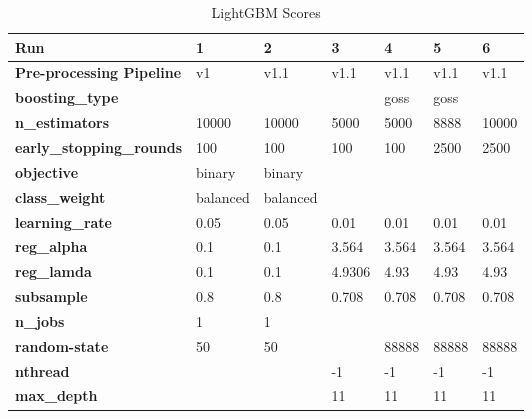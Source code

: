 \documentclass[sigconf, nonacm]{acmart}
\begin{document}
\begin{table}[t]
	\centering
	\caption{LightGBM Scores}
	\label{tab:lgb}
	\begin{tabular}{@{}|l|l|l|l|l|l|l|@{}}
		\toprule
		\textbf{Run}                     & \textbf{1} & \textbf{2} & \textbf{3} & \textbf{4} & \textbf{5} & \textbf{6} \\ \midrule
		\textbf{Pre-processing Pipeline} & v1         & v1.1       & v1.1       & v1.1       & v1.1       & v1.1       \\ \midrule
		\textbf{boosting\_type}          &            &            &            & goss       & goss       &            \\ \midrule
		\textbf{n\_estimators}           & 10000      & 10000      & 5000       & 5000       & 8888       & 10000      \\ \midrule
		\textbf{early\_stopping\_rounds} & 100        & 100        & 100        & 100        & 2500       & 2500       \\ \midrule
		\textbf{objective}               & binary     & binary     &            &            &            &            \\ \midrule
		\textbf{class\_weight}           & balanced   & balanced   &            &            &            &            \\ \midrule
		\textbf{learning\_rate}          & 0.05       & 0.05       & 0.01       & 0.01       & 0.01       & 0.01       \\ \midrule
		\textbf{reg\_alpha}              & 0.1        & 0.1        & 3.564      & 3.564      & 3.564      & 3.564      \\ \midrule
		\textbf{reg\_lamda}              & 0.1        & 0.1        & 4.9306     & 4.93       & 4.93       & 4.93       \\ \midrule
		\textbf{subsample}               & 0.8        & 0.8        & 0.708      & 0.708      & 0.708      & 0.708      \\ \midrule
		\textbf{n\_jobs}                 & 1          & 1          &            &            &            &            \\ \midrule
		\textbf{random-state}            & 50         & 50         &            & 88888      & 88888      & 88888      \\ \midrule
		\textbf{nthread}                 &            &            & -1         & -1         & -1         & -1         \\ \midrule
		\textbf{max\_depth}              &            &            & 11         & 11         & 11         & 11         \\ \midrule

\end{tabular}
\end{table}
\end{document}
